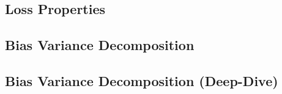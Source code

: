 \subsection{Loss Properties}


\subsection{Bias Variance Decomposition}


\subsection{Bias Variance Decomposition (Deep-Dive)}

